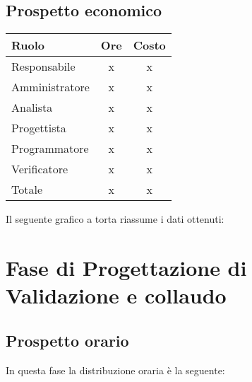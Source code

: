 {{{{{{{\subsection{Prospetto economico}\label{5.4.2}
\quad
\def\tabularxcolumn#1{m{#1}}
{	
	\begin{center}
		\renewcommand{\arraystretch}{1.4}
		\begin{tabularx}{7cm}{|X|c|c|}
			\hline
			\rowcolor{airforceblue}
			\textbf{Ruolo} & \textbf{Ore} & \textbf{Costo}\\
			\hline
			Responsabile & x & x\\
			\hline
			Amministratore & x & x\\
			\hline
			Analista & x & x\\
			\hline
			Progettista & x & x\\
			\hline
			Programmatore & x & x\\
			\hline
			Verificatore & x & x\\
			\hline
			Totale & x & x\\
			\hline
		\end{tabularx}
	\end{center}

Il seguente grafico a torta riassume i dati ottenuti:

\section{Fase di Progettazione di Validazione e collaudo}\label{5.5}

\subsection{Prospetto orario}\label{5.5.1}
In questa fase la distribuzione oraria è la seguente:
\quad
\def\tabularxcolumn#1{m{#1}}
{
	
}}}}}}}}}
